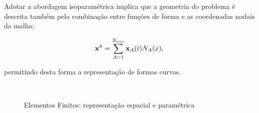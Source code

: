 \documentclass[tese_patricia]{subfiles}%
\begin{document}
Adotar a abordagem isoparamétrica implica que a geometria do problema é descrita também pela combinação entre funções de forma e as coordenadas nodais da malha:

\begin{align}
\mathbf{x}^{h} = \sum_{A = 1}^{N_{nos}} \mathbf{x}_{A}(t)N_{A}(x),
\end{align}

\noindent permitindo desta forma a representação de formas curvas.

\begin{figure}[!htb]
	\centering	
	\\
	\caption{Elementos Finitos: representação espacial e paramétrica}
\end{figure}
\end{document}
